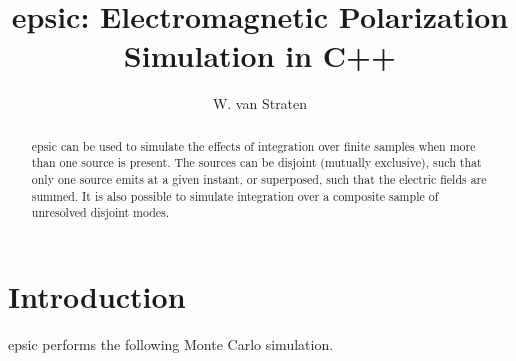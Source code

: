 \documentclass[preprint]{aastex6}
\begin{document}
\title{ {\sc epsic}: Electromagnetic Polarization Simulation in C++ }

\author{W. van Straten}

\begin{abstract}

  {\sc epsic} can be used to simulate the effects of integration over finite samples when more than one source is present. The sources can be disjoint (mutually exclusive), such that only one source emits at a given instant, or superposed, such that the electric fields are summed. It is also possible to simulate integration over a composite sample of unresolved disjoint modes.

\end{abstract}



\section {Introduction}

{\sc epsic} performs the following Monte Carlo simulation.
\end{document}
